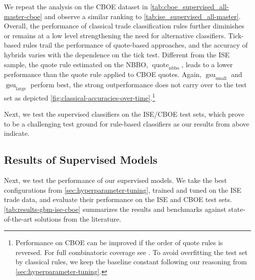 We repeat the analysis on the \gls{CBOE} dataset in \cref{tab:cboe_supervised_all-master-cboe} and observe a similar ranking to \cref{tab:ise_supervised_all-master}. Overall, the performance of classical trade classification rules further diminishes or remains at a low level strengthening the need for alternative classifiers. Tick-based rules trail the performance of quote-based approaches, and the accuracy of hybrids varies with the dependence on the tick test. Different from the \gls{ISE} sample, the quote rule estimated on the \gls{NBBO}, $\operatorname{quote}_{\mathrm{nbbo}}$, leads to a lower performance than the quote rule applied to \gls{CBOE} quotes.
Again, $\operatorname{gsu}_{\mathrm{small}}$ and $\operatorname{gsu}_{\mathrm{large}}$ perform best, the strong outperformance does not carry over to the test set as depicted \cref{fig:classical-accuracies-over-time}.\footnote{Performance on \gls{CBOE} can be improved if the order of quote rules is reversed. For full combinatoric coverage see \textcite[][33]{grauerOptionTradeClassification2022}. To avoid overfitting the test set by classical rules, we keep the baseline constant following our reasoning from \cref{sec:hyperparameter-tuning}.}


Next, we test the supervised classifiers on the \gls{ISE}/\gls{CBOE} test sets, which prove to be a challenging test ground for rule-based classifiers as our results from above indicate.

\subsection{Results of Supervised
    Models}\label{sec:results-of-supervised-models}

Next, we test the performance of our supervised models. We take the best configurations from \cref{sec:hyperparameter-tuning}, trained and tuned on the \gls{ISE} trade data, and evaluate their performance on the \gls{ISE} and \gls{CBOE} test sets. \cref{tab:results-gbm-ise-cboe} summarizes the results and benchmarks against state-of-the-art solutions from the literature.

